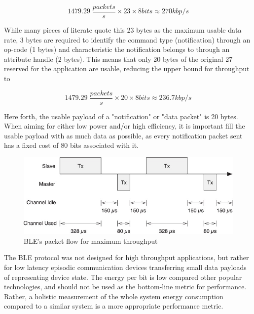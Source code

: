 \documentclass[]{article}
\begin{document}
\begin{displaymath}
1479.29 \; \frac{packets}{s} \times 23 \times 8 bits \approx 270 kbp/s
\end{displaymath}

While many pieces of literate quote this 23 bytes as the maximum usable data rate, 3 bytes are required to identify the command type (notification) through an op-code (1 bytes) and  characteristic the notification belongs to through an attribute handle (2 bytes). This means that only 20 bytes of the original 27 reserved for the application are usable, reducing the upper bound for throughput to 

\begin{displaymath}
1479.29 \; \frac{packets}{s} \times 20 \times 8 bits \approx 236.7 kbp/s
\end{displaymath}

Here forth, the usable payload of a "notification" or "data packet" is 20 bytes. When aiming for either low power and/or high efficiency, it is important fill the usable payload with as much data as possible, as every notification packet sent has a fixed cost of 80 bits associated with it.  

\begin{figure}[h]
	\centering
		\includegraphics[width = 1\textwidth]{turnaround}
	\caption{\ac{BLE}'s packet flow for maximum throughput}
	\label{fig:turnaround}
\end{figure}

The \ac{BLE} protocol was not designed for high throughput applications, but rather for low latency episodic communication devices transferring small data payloads of representing device state. The energy per bit is low compared other popular technologies, and should not be used as the bottom-line metric for performance. Rather, a holistic measurement of the whole system energy consumption compared to a similar system is a more appropriate performance metric.
\end{document}
